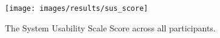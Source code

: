 
\begin{figure}[H]
	\centering
    \texttt{[image: images/results/sus\_score]}
    \caption{The System Usability Scale Score across all participants.}
    \label{fig:sus_score_participants}
\end{figure}
